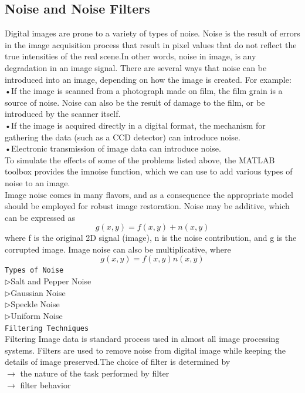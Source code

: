 \documentclass[12pt]{article}
\begin{document}
\subsection{Noise and Noise Filters}
Digital images are prone to a variety of types of noise. Noise is the result of errors in the image acquisition process that result in pixel values that do not reflect the true intensities of the real scene.In other words, noise in image, is any degradation in an image signal. There are several ways that noise can be introduced into an image, depending on how the image is created. For example:\\
•\quad If the image is scanned from a photograph made on film, the film grain is a source of noise. Noise can also be the result of damage to the film, or be introduced by the scanner itself.\\
•\quad If the image is acquired directly in a digital format, the mechanism for gathering the data (such as a CCD detector) can introduce noise.\\
•\quad Electronic transmission of image data can introduce noise.\\
To simulate the effects of some of the problems listed above, the MATLAB toolbox provides the imnoise function, which we can use to add various types of noise to an image.\\
Image noise comes in many flavors, and as a consequence the appropriate model should be employed for robust image restoration. Noise may be additive, which can be expressed as
$$ g(x,y) = f(x,y) + n(x,y)$$
where f is the original 2D signal (image), n is the noise contribution, and g is the corrupted image.
Image noise can also be multiplicative, where
$$ g(x,y) = f(x,y) n(x,y)$$
\texttt{Types of Noise}\\
$\rhd$\quad Salt and Pepper Noise\\
$\rhd$\quad Gaussian Noise\\
$\rhd$\quad Speckle Noise\\
$\rhd$\quad Uniform Noise\\
\texttt{Filtering Techniques}\\
Filtering Image data is standard process used in almost all image processing systems. Filters are used to remove noise from digital image while keeping the details of image preserved.The choice of filter is determined by\\
$\rightarrow$ \quad the nature of the task performed by filter\\
$\rightarrow$ \quad filter behavior\\
\end{document}
